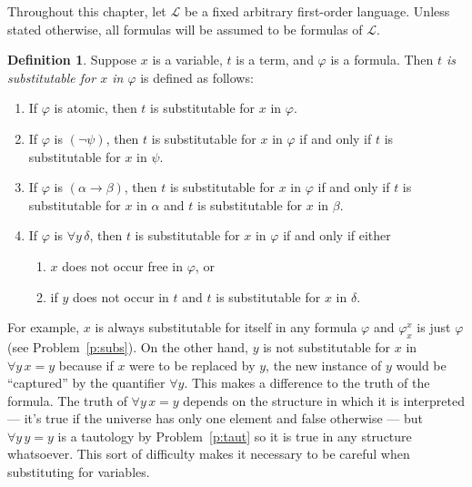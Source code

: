 \documentclass[12pt]{amsbook}
\theoremstyle{plain}
\theoremstyle{definition}
\newtheorem{defn}{Definition}[chapter]
\theoremstyle{remark}
\begin{document}
Throughout this chapter,  let $\mathcal{L}$ be a fixed arbitrary first-order language.  Unless stated otherwise,  all formulas will be assumed to be formulas of $\mathcal{L}$.


\begin{defn} \label{d:subs} 
Suppose $x$ is a variable,  $t$ is a term,  and $\varphi$ is a formula.  Then {\em $t$ is substitutable for $x$ in $\varphi$\/} is defined as follows:
\begin{enumerate}
\item If $\varphi$ is atomic,  then $t$ is substitutable for $x$ in $\varphi$. 
\item If $\varphi$ is $(\lnot \psi)$,  then $t$ is substitutable for $x$ in $\varphi$ if and only if $t$ is substitutable for $x$ in $\psi$.
\item If $\varphi$ is $(\alpha \to \beta)$,  then $t$ is substitutable for $x$ in $\varphi$ if and only if $t$ is substitutable for $x$ in $\alpha$ and $t$ is substitutable for $x$ in $\beta$.
\item If $\varphi$ is $\forall y \, \delta$,  then $t$ is substitutable for $x$ in $\varphi$ if and only if either 
 \begin{enumerate}
  \item $x$ does not occur free in $\varphi$,  or 
  \item if $y$ does not occur in $t$ and $t$ is substitutable for $x$ in $\delta$.
  \end{enumerate}
\end{enumerate}
\end{defn}

For example,  $x$ is always substitutable for itself in any formula $\varphi$ and $\varphi^x_x$ is just $\varphi$ (see Problem~\ref{p:subs}).  On the other hand,  $y$ is not substitutable for $x$ in $\forall y\, x = y$ because if $x$ were to be replaced by $y$,  the new instance of $y$ would be ``captured'' by the quantifier $\forall y$.  This makes a difference to the truth of the formula.  The truth of $\forall y\, x = y$ depends on the structure in which it is interpreted --- it's true if the universe has only one element and false otherwise --- but $\forall y\, y = y$ is a tautology by Problem~\ref{p:taut} so it is true in any structure whatsoever.  This sort of difficulty makes it necessary to be careful when substituting for variables.
\end{document}
